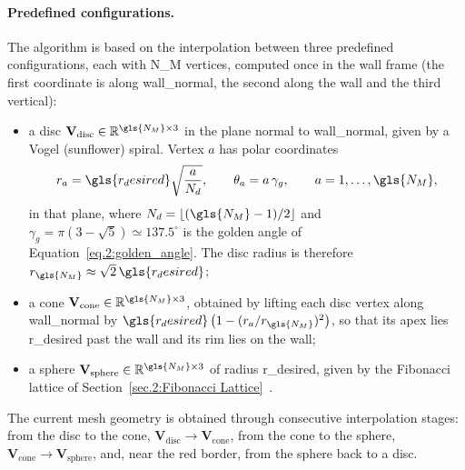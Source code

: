 \paragraph{Predefined configurations.}
The algorithm is based on the interpolation between three predefined configurations, each with \gls{N_M} vertices, computed once in the wall frame (the first coordinate is along \gls{wall_normal}, the second along the wall and the third vertical):
\begin{itemize}
    \item a disc $\mathbf{V}_{\mathrm{disc}}\in\mathbb{R}^{\gls{N_M}\times3}$ in the plane normal to \gls{wall_normal}, given by a Vogel (sunflower) spiral. Vertex $a$ has polar coordinates
    \begin{equation}
        r_a=\gls{r_desired}\sqrt{\frac{a}{N_d}},\qquad \theta_a=a\,\gamma_g,\qquad a=1,\dots,\gls{N_M},
        \label{eq.6:vogel}
    \end{equation}
    in that plane, where $N_d=\lfloor(\gls{N_M}-1)/2\rfloor$ and $\gamma_g=\pi(3-\sqrt5)\simeq137.5^\circ$ is the golden angle of Equation~\eqref{eq.2:golden_angle}. The disc radius is therefore $r_{\gls{N_M}}\approx\sqrt2\,\gls{r_desired}$;
    \item a cone $\mathbf{V}_{\mathrm{cone}}\in\mathbb{R}^{\gls{N_M}\times3}$, obtained by lifting each disc vertex along \gls{wall_normal} by $\gls{r_desired}\,\big(1-(r_a/r_{\gls{N_M}})^2\big)$, so that its apex lies \gls{r_desired} past the wall and its rim lies on the wall;
    \item a sphere $\mathbf{V}_{\mathrm{sphere}}\in\mathbb{R}^{\gls{N_M}\times3}$ of radius \gls{r_desired}, given by the Fibonacci lattice of Section~\ref{sec.2:Fibonacci Lattice}~\cite{Latitude_Longitude_vs_fibonacci}.
\end{itemize}
The current mesh geometry is obtained through consecutive interpolation stages: from the disc to the cone, $\mathbf{V}_{\mathrm{disc}}\rightarrow\mathbf{V}_{\mathrm{cone}}$, from the cone to the sphere, $\mathbf{V}_{\mathrm{cone}}\rightarrow\mathbf{V}_{\mathrm{sphere}}$, and, near the red border, from the sphere back to a disc.

